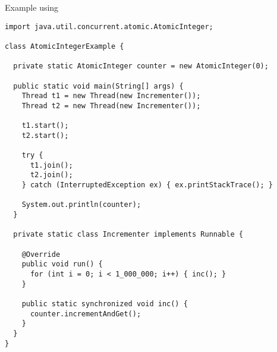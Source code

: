 
\begin{cl}{Example using }
\begin{lstlisting}[language=MyJava]
import java.util.concurrent.atomic.AtomicInteger;

class AtomicIntegerExample {

  private static AtomicInteger counter = new AtomicInteger(0);

  public static void main(String[] args) {
    Thread t1 = new Thread(new Incrementer());
    Thread t2 = new Thread(new Incrementer());

    t1.start();
    t2.start();

    try {
      t1.join();
      t2.join();
    } catch (InterruptedException ex) { ex.printStackTrace(); }

    System.out.println(counter);
  }

  private static class Incrementer implements Runnable {

    @Override
    public void run() {
      for (int i = 0; i < 1_000_000; i++) { inc(); }
    }

    public static synchronized void inc() {
      counter.incrementAndGet();
    }
  }
}
\end{lstlisting}
\end{cl}



